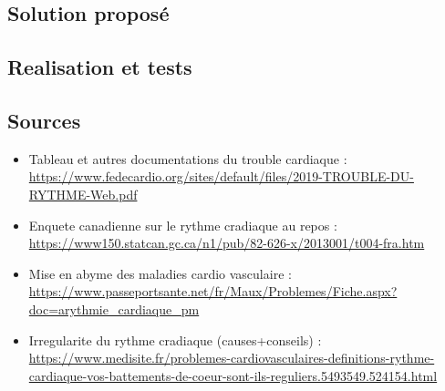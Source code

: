	\subsection{Solution proposé}

	\subsection{Realisation et tests}

	\subsection{Sources}
\begin{itemize}
\item Tableau et autres documentations du trouble cardiaque : \textcolor{blue}{\url{https://www.fedecardio.org/sites/default/files/2019-TROUBLE-DU-RYTHME-Web.pdf}}
\item Enquete canadienne sur le rythme cradiaque au repos : \textcolor{blue}{\url{https://www150.statcan.gc.ca/n1/pub/82-626-x/2013001/t004-fra.htm}}
\item Mise en abyme des maladies cardio vasculaire : \textcolor{blue}{\url{https://www.passeportsante.net/fr/Maux/Problemes/Fiche.aspx?doc=arythmie_cardiaque_pm}}
\item Irregularite du rythme cradiaque (causes+conseils) : \textcolor{blue}{\url{https://www.medisite.fr/problemes-cardiovasculaires-definitions-rythme-cardiaque-vos-battements-de-coeur-sont-ils-reguliers.5493549.524154.html}}
\end{itemize}

